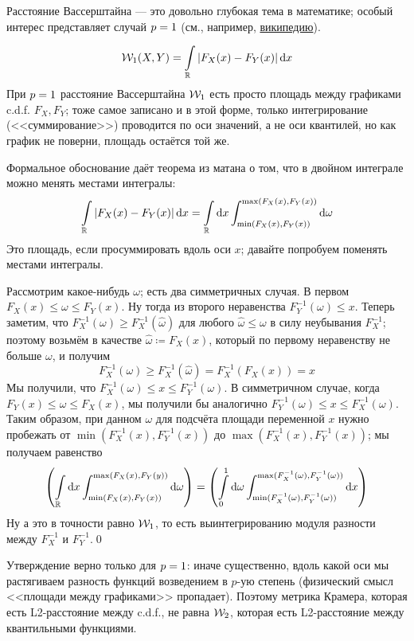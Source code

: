 Расстояние Вассерштайна --- это довольно глубокая тема в математике; особый интерес представляет случай $p \HM= 1$ (см., например, \href{https://en.wikipedia.org/wiki/Wasserstein_metric}{википедию}). 

\begin{theorem}
\begin{equation}\label{W1equiv}
\mathcal{W}_1(X, Y) = \int\limits_{\mathbb{R}} \left| F_X(x) - F_Y(x) \right| \mathop{}\!\mathrm{d} x
\end{equation}
\beginproof
При $p \HM= 1$ расстояние Вассерштайна $\mathcal{W}_1$ есть просто площадь между графиками c.d.f. $F_X, F_Y$; тоже самое записано и в этой форме, только интегрирование (<<суммирование>>) проводится по оси значений, а не оси квантилей, но как график не поверни, площадь остаётся той же.

Формальное обоснование даёт теорема из матана о том, что в двойном интеграле можно менять местами интегралы:
$$ \int\limits_{\mathbb{R}} \left| F_X(x) - F_Y(x) \right| \mathop{}\!\mathrm{d} x = \int\limits_{\mathbb{R}} \mathop{}\!\mathrm{d} x \int\nolimits_{\min(F_X(x), F_Y(x))}^{\max(F_X(x), F_Y(x))} \mathop{}\!\mathrm{d} \omega$$
Это площадь, если просуммировать вдоль оси $x$; давайте попробуем поменять местами интегралы. 

Рассмотрим какое-нибудь $\omega$; есть два симметричных случая. В первом $F_X(x) \le \omega \le F_Y(x)$. Ну тогда из второго неравенства $F_Y^{-1}(\omega) \le x$. Теперь заметим, что $F^{-1}_X(\omega) \ge F^{-1}_X(\hat{\omega})$ для любого $\hat{\omega} \le \omega$ в силу неубывания $F^{-1}_X$; поэтому возьмём в качестве $\hat{\omega} \coloneqq F_X(x)$, который по первому неравенству не больше $\omega$, и получим 
$$F^{-1}_X(\omega) \ge F^{-1}_X(\hat{\omega}) = F^{-1}_X(F_X(x)) = x$$
Мы получили, что $F^{-1}_X(\omega) \le x \le F^{-1}_Y(\omega)$. В симметричном случае, когда $F_Y(x) \le \omega \le F_X(x)$, мы получили бы аналогично $F^{-1}_Y(\omega) \le x \le F^{-1}_X(\omega)$. Таким образом, при данном $\omega$ для подсчёта площади переменной $x$ нужно пробежать от $\min(F^{-1}_X(x), F^{-1}_Y(x))$ до $\max(F^{-1}_X(x), F^{-1}_Y(x))$; мы получаем равенство
$$ \left( \int\limits_{\mathbb{R}} \mathop{}\!\mathrm{d} x \int\nolimits_{\min(F_X(x), F_Y(x))}^{\max(F_X(x), F_Y(y))} \mathop{}\!\mathrm{d} \omega \right) = \left( \int\limits_0^1 \mathop{}\!\mathrm{d} \omega \int\nolimits_{\min(F^{-1}_X(\omega), F^{-1}_Y(\omega))}^{\max(F^{-1}_X(\omega), F^{-1}_Y(\omega))} \mathop{}\!\mathrm{d} x \right)$$
Ну а это в точности равно $\mathcal{W}_1$, то есть выинтегрированию модуля разности между $F^{-1}_X$ и $F^{-1}_Y$.\qed

\beginproof[Замечание] Утверждение верно только для $p \HM= 1$: иначе существенно, вдоль какой оси мы растягиваем разность функций возведением в $p$-ую степень (физический смысл <<площади между графиками>> пропадает). Поэтому метрика Крамера, которая есть L2-расстояние между c.d.f., не равна $\mathcal{W}_2$, которая есть L2-расстояние между квантильными функциями.
\end{theorem}

